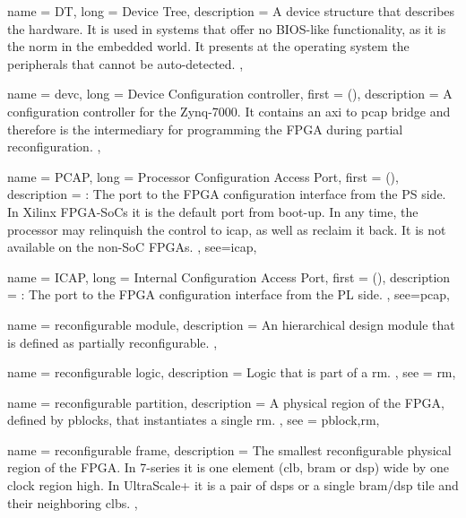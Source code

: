 {
	name = {DT},
	long = {Device Tree},
	description = {
		A device structure that describes the hardware.
		It is used in systems that offer no BIOS-like functionality,
		as it is the norm in the embedded world. It presents 
		at the operating system the peripherals that cannot be auto-detected.
	},
}

{
	name = {devc},
	long = {Device Configuration controller},
	first = { ()},
	description = {
		A configuration controller for the Zynq-7000.
		It contains an \gls{axi} to \gls{pcap} bridge
		and therefore is the intermediary
		for programming the FPGA during partial reconfiguration.
	},
}

{
	name = {PCAP},
	long = {Processor Configuration Access Port},
	first = { ()},
	description = {\emph{}:
		The port to the FPGA configuration interface from the PS side.
		In Xilinx FPGA-SoCs it is the default port from boot-up.
		In any time, the processor may relinquish the control to \gls{icap},
		as well as reclaim it back. It is not available on the non-SoC FPGAs.
	},
	see={icap},
}


{
	name = {ICAP},
	long = {Internal Configuration Access Port},
	first = { ()},
	description = {\emph{}:
		The port to the FPGA configuration interface from the PL side.
	},
	see={pcap},
}


{
	name = {reconfigurable module},
	description = {
		An hierarchical design module that is defined as partially reconfigurable.
	},
}


{
	name = {reconfigurable logic},
	description = {
		Logic that is part of a \gls{rm}.
	},
	see = {rm},
}


{
	name = {reconfigurable partition},
	description = {
		A physical region of the FPGA, defined by \glspl{pblock},
		that instantiates a single \gls{rm}.
	},
	see = {pblock,rm},
}

{
	name = {reconfigurable frame},
	description = {
		The smallest reconfigurable physical region of the FPGA. 
		In 7-series it is one element (\gls{clb}, \gls{bram} or \gls{dsp}) wide by one clock region high.
		In UltraScale+ it is a pair of \glspl{dsp} or a single \gls{bram}/\gls{dsp} 
		tile and their neighboring \glspl{clb}.
	},
}


